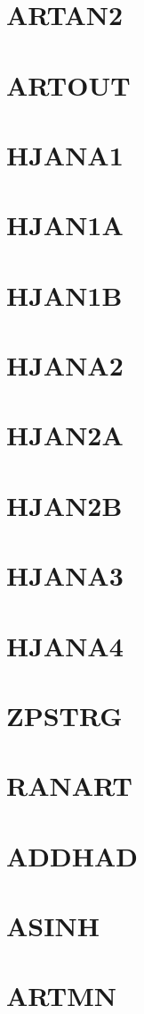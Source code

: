 \documentclass[10pt,UTF8]{ctexbook}
\begin{document}
\section{ARTAN2}
\section{ARTOUT}
\section{HJANA1}
\section{HJAN1A}
\section{HJAN1B}
\section{HJANA2}
\section{HJAN2A}
\section{HJAN2B}
\section{HJANA3}
\section{HJANA4}
\section{ZPSTRG}
\section{RANART}
\section{ADDHAD}
\section{ASINH}
\section{ARTMN}
\end{document}
